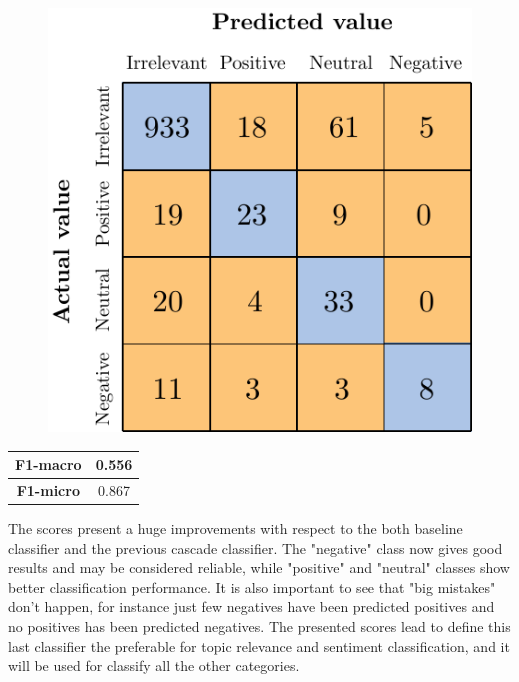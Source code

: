 \begin{figure}[H]
	\centering
	\includegraphics[scale=1]{figures/conf_matrices/ita_cascade_bpef/ita_cascade_bpef_val.pdf}
	\label{fig:ita_cascade_bpef_val}
\end{figure}

\begin{center}
	\begin{tabular}{ | c | c | } 
		\hline
		\textbf{F1-macro} & 0.556 \\
		\hline
		\textbf{F1-micro} & 0.867 \\ 
		\hline
	\end{tabular}
\end{center}

The scores present a huge improvements with respect to the both baseline classifier and the previous cascade classifier. The "negative" class now gives good results and may be considered reliable, while "positive" and "neutral" classes show better classification performance. It is also important to see that "big mistakes" don't happen, for instance just few negatives have been predicted positives and no positives has been predicted negatives. The presented scores lead to define this last classifier the preferable for topic relevance and sentiment classification, and it will be used for classify all the other categories.





